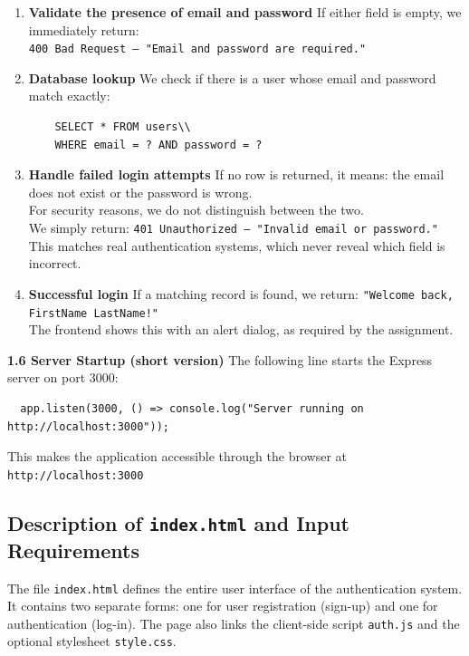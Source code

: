 \documentclass[11pt,a4paper]{report}
\begin{document}
\begin{enumerate}
    \item\textbf{Validate the presence of email and password}
    If either field is empty, we immediately return:\\
    \texttt{400 Bad Request – "Email and password are required."}
    \item\textbf{Database lookup}
    We check if there is a user whose email and password match exactly:
    \begin{lstlisting}
    SELECT * FROM users\\
    WHERE email = ? AND password = ?
    \end{lstlisting}
   
\item\textbf{Handle failed login attempts}
    If no row is returned, it means: the email does not exist or the password is wrong.\\
    For security reasons, we do not distinguish between the two.\\
    We simply return: \texttt{401 Unauthorized – "Invalid email or password."}\\
    This matches real authentication systems, which never reveal which field is incorrect.
\item\textbf{Successful login}
    If a matching record is found, we return: \texttt{"Welcome back, FirstName LastName!"}\\
    The frontend shows this with an alert dialog, as required by the assignment.\\
\end{enumerate}
\textbf{1.6 Server Startup (short version)}
The following line starts the Express server on port 3000:
\begin{lstlisting}
  app.listen(3000, () => console.log("Server running on http://localhost:3000"));  
\end{lstlisting}

This makes the application accessible through the browser at \texttt{http://localhost:3000}


\subsection{Description of \texttt{index.html} and Input Requirements}

The file \texttt{index.html} defines the entire user interface of the authentication system.
 It contains two separate forms: one for user registration (sign-up) and one for authentication (log-in). The page also links the client-side script \texttt{auth.js} and the optional stylesheet \texttt{style.css}.
 
\end{document}
